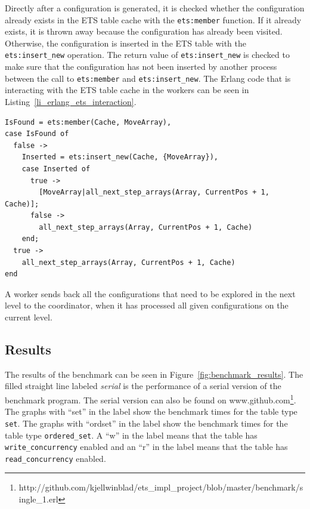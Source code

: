 \documentclass[aps,pre,preprint,nofootinbib]{revtex4}
\begin{document}
Directly after a configuration is generated, it is checked whether the configuration already exists in the ETS table cache with the \verb|ets:member| function.
If it already exists, it is thrown away because the configuration has already been visited.
Otherwise, the configuration is inserted in the ETS table with the \verb|ets:insert_new| operation.
The return value of \verb|ets:insert_new| is checked to make sure that the configuration has not been inserted by another process between the call to \verb|ets:member| and \verb|ets:insert_new|.
The Erlang code that is interacting with the ETS table cache in the workers can be seen in Listing~\ref{li_erlang_ets_interaction}. 

\lstset{basicstyle=\ttfamily, keywordstyle=\bfseries, language=erlang, caption=Worker code that is interacting with ETS, label=li_erlang_ets_interaction}
\begin{lstlisting}[float=htb]
IsFound = ets:member(Cache, MoveArray),
case IsFound of
  false ->
    Inserted = ets:insert_new(Cache, {MoveArray}),
    case Inserted of
      true ->
        [MoveArray|all_next_step_arrays(Array, CurrentPos + 1, Cache)];
      false ->
        all_next_step_arrays(Array, CurrentPos + 1, Cache)
    end;
  true ->
    all_next_step_arrays(Array, CurrentPos + 1, Cache)
end
\end{lstlisting}

A worker sends back all the configurations that need to be explored in the next level to the coordinator, when it has processed all given configurations on the current level.

\subsection{Results} 

The results of the benchmark can be seen in Figure~\ref{fig:benchmark_results}.
The filled straight line labeled \emph{serial} is the performance of a serial version of the benchmark program.
The serial version can also be found on www.github.com\footnote{http://github.com/kjellwinblad/ets\_impl\_project/blob/master/benchmark/single\_1.erl}.
The graphs with ``set'' in the label show the benchmark times for the table type \verb|set|.
The graphs with ``ordset'' in the label show the benchmark times for the table type \verb|ordered_set|.
A ``w'' in the label means that the table has \verb|write_concurrency| enabled and an ``r'' in the label means that the table has \verb|read_concurrency| enabled.
\end{document}
